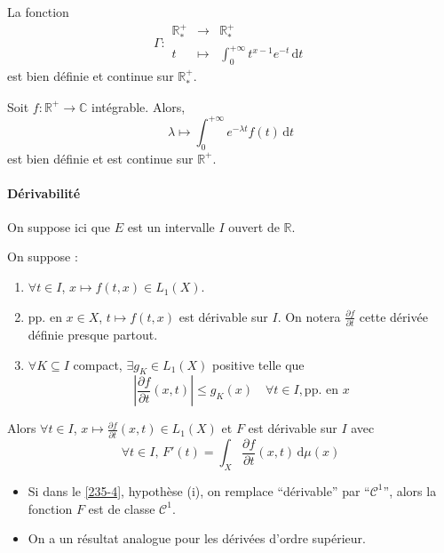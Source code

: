 	
	\begin{example}
		\label{235-3}
		La fonction
		\[ \Gamma :
		\begin{array}{ccc}
			\mathbb{R}^+_* &\rightarrow& \mathbb{R}^+_* \\
			t &\mapsto& \int_{0}^{+\infty} t^{x-1} e^{-t} \, \mathrm{d}t
		\end{array}
		\]
		est bien définie et continue sur $\mathbb{R}^+_*$.
	\end{example}
	
	
	\begin{example}
		Soit $f : \mathbb{R}^+ \rightarrow \mathbb{C}$ intégrable. Alors,
		\[ \lambda \mapsto \int_0^{+\infty} e^{-\lambda t} f(t) \, \mathrm{d}t \]
		est bien définie et est continue sur $\mathbb{R}^+$.
	\end{example}
	
	\paragraph{Dérivabilité}
	
	
	On suppose ici que $E$ est un intervalle $I$ ouvert de $\mathbb{R}$.
	
	\begin{theorem}
		\label{235-4}
		On suppose :
		\begin{enumerate}[label=(\roman*)]
			\item $\forall t \in I$, $x \mapsto f(t,x) \in L_1(X)$.
			\item pp. en $x \in X$, $t \mapsto f(t,x)$ est dérivable sur $I$. On notera $\frac{\partial f}{\partial t}$ cette dérivée définie presque partout.
			\item $\forall K \subseteq I$ compact, $\exists g_K \in L_1(X)$ positive telle que
			\[ \left| \frac{\partial f}{\partial t}(x,t) \right| \leq g_K(x) \quad \forall t \in I, \text{pp. en } x \]
		\end{enumerate}
		Alors $\forall t \in I$, $x \mapsto \frac{\partial f}{\partial t}(x, t) \in L_1(X)$ et $F$ est dérivable sur $I$ avec
		\[ \forall t \in I, \, F'(t) = \int_X \frac{\partial f}{\partial t}(x, t) \, \mathrm{d}\mu(x) \]
	\end{theorem}
	
	\begin{remark}
		\begin{itemize}
			\item Si dans le \cref{235-4}, hypothèse (i), on remplace ``dérivable'' par ``$\mathcal{C}^1$'', alors la fonction $F$ est de classe $\mathcal{C}^1$.
			\item On a un résultat analogue pour les dérivées d'ordre supérieur.
		\end{itemize}
	\end{remark}
	
